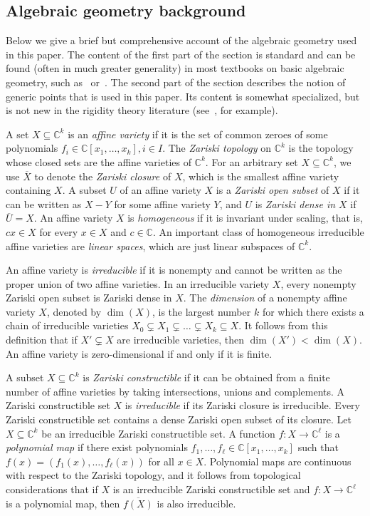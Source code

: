 \documentclass[11pt,a4paper,dvipsnames]{scrartcl}
\theoremstyle{definition}
\newcommand{\CC}{\mathbb{C}}
\begin{document}
\subsection{Algebraic geometry background}\label{appendix:alggeo}

Below we give a brief but comprehensive account of the algebraic geometry used in this paper. The content of the first part of the section is standard and can be found (often in much greater generality) in most textbooks on basic algebraic geometry, such as~\cite{harris_1995} or~\cite{shafarevich_2013}. The second part of the section describes the notion of generic points that is used in this paper. Its content is somewhat specialized, but is not new in the rigidity theory literature (see~\cite{garamvolgyi.etal_2022,gortler.etal_2019}, for example).

A set $X \subseteq \CC^k$ is an \emph{affine variety} if it is the set of common zeroes of some polynomials $f_i \in \CC[x_1,\ldots,x_k], i \in I$. The \emph{Zariski topology} on $\CC^k$ is the topology whose closed sets are the affine varieties of $\CC^k$.%
For an arbitrary set $X \subseteq \CC^k$, we use $\overline{X}$ to denote the \emph{Zariski closure} of $X$, which is the smallest affine variety containing $X$. A subset $U$ of an affine variety $X$ is a \emph{Zariski open subset} of $X$ if it can be written as $X - Y$ for some affine variety $Y$, and $U$ is \emph{Zariski dense in $X$} if $\overline{U} = X$.
An affine variety $X$ is \emph{homogeneous} if it is invariant under scaling, that is, $cx \in X$ for every $x \in X$ and $c \in \CC$.
An important class of homogeneous irreducible affine varieties are \emph{linear spaces}, which are just linear subspaces of $\CC^k$. 

An affine variety is \emph{irreducible} if it is nonempty and cannot be written as the proper union of two affine varieties. 
In an irreducible variety $X$, every nonempty Zariski open subset 
is Zariski dense in $X$. %
The \emph{dimension} of a nonempty affine variety $X$, denoted by $\dim(X)$, is the largest number $k$ for which there exists a chain of irreducible varieties $X_0 \subsetneq X_1 \subsetneq \ldots \subsetneq X_k \subseteq X$. It follows from this definition that if $X' \subsetneq X$ are irreducible varieties, then $\dim(X') < \dim(X)$. An affine variety is zero-dimensional if and only if it is finite.


A subset $X \subseteq \CC^k$ is \emph{Zariski constructible} if it can be obtained from a finite number of affine varieties by taking intersections, unions and complements. 
A Zariski constructible set $X$ is \emph{irreducible} if its Zariski closure is irreducible. Every Zariski constructible set contains a dense Zariski open subset of its closure.
Let $X \subseteq \CC^k$ be an irreducible Zariski constructible set.
A function $f: X \rightarrow \CC^\ell$ is a \emph{polynomial map} if there exist polynomials $f_1,\ldots,f_\ell \in \CC[x_1,\ldots,x_k]$ such that $f(x) = (f_1(x),\ldots,f_\ell(x))$ for all $x \in X$. Polynomial maps are continuous with respect to the Zariski topology, and it follows from topological considerations that if $X$ is an irreducible Zariski constructible set and $f : X \rightarrow \CC^\ell$ is a polynomial map, then $\overline{f(X)}$ is also irreducible.
\end{document}

